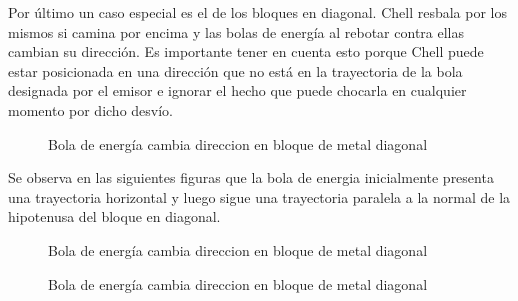 \documentclass[a4paper]{article}
\begin{document}
Por último un caso especial es el de los bloques en diagonal. Chell resbala por los mismos si camina por encima y las bolas de energía al rebotar contra ellas cambian su dirección. Es importante tener en cuenta esto porque Chell puede estar posicionada en una dirección que no está en la trayectoria de la bola designada por el emisor e ignorar el hecho que puede chocarla en cualquier momento por dicho desvío.

\begin{figure}[!h]
	\caption{Bola de energía cambia direccion en bloque de metal diagonal}
	\label{fig:diagrama12}
\end{figure}

Se observa en las siguientes figuras que la bola de energia inicialmente presenta una trayectoria horizontal y luego sigue una trayectoria paralela a la normal de la hipotenusa del bloque en diagonal.

\begin{figure}[!h]
	\caption{Bola de energía cambia direccion en bloque de metal diagonal}
	\label{fig:diagrama13}
\end{figure}

\begin{figure}[!h]
	\caption{Bola de energía cambia direccion en bloque de metal diagonal}
	\label{fig:diagrama14}
\end{figure}
\end{document}
